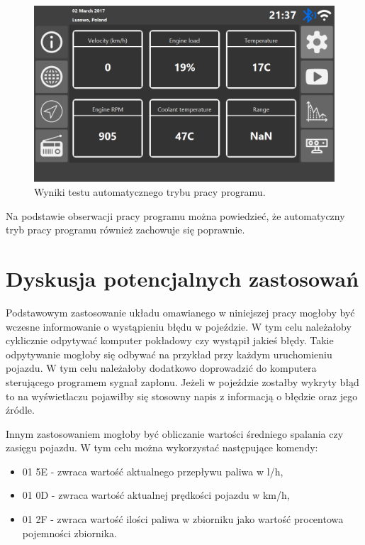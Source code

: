 \documentclass[12pt]{article} %
\numberwithin{equation}{subsection}
\numberwithin{figure}{section}
\numberwithin{table}{section}
\begin{document}
	\begin{figure}[!h]
			\centering
			\includegraphics[scale=0.55]{Images/rys_test_auto.png}
			\caption{Wyniki testu automatycznego trybu pracy programu.}
			\label{rys_wyniki_testu_automatycznego}
		\end{figure}
	
	
	Na podstawie obserwacji pracy programu można powiedzieć, że automatyczny tryb pracy programu również zachowuje się poprawnie.
	
	\newpage
	
	\section{Dyskusja potencjalnych zastosowań}
	
	\hspace{0.5cm}Podstawowym zastosowanie układu omawianego w niniejszej pracy mogłoby być wczesne informowanie o wystąpieniu błędu w pojeździe. W tym celu należałoby cyklicznie odpytywać komputer pokładowy czy wystąpił jakieś błędy. Takie odpytywanie mogłoby się odbywać na przykład przy każdym uruchomieniu pojazdu. W tym celu należałoby dodatkowo doprowadzić do komputera sterującego programem sygnał zapłonu. Jeżeli w pojeździe zostałby wykryty błąd to na wyświetlaczu pojawiłby się stosowny napis z informacją o błędzie oraz jego źródle.
	
	Innym zastosowaniem mogłoby być obliczanie wartości średniego spalania czy zasięgu pojazdu. W tym celu można wykorzystać następujące komendy:
	
	\begin{itemize}
		\item{01 5E - zwraca wartość aktualnego przepływu paliwa w l/h,}
		\item{01 0D - zwraca wartość aktualnej prędkości pojazdu w km/h,}
		\item{01 2F - zwraca wartość ilości paliwa w zbiorniku jako wartość procentowa pojemności zbiornika.}
	\end{itemize}
	
\end{document}

